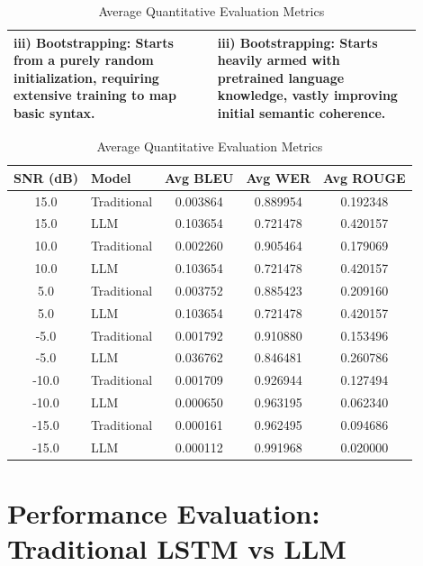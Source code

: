 \documentclass[twocolumn]{article}
\begin{document}
\begin{table}[t]
\begin{minipage}[t]{0.48\textwidth}
\begin{tabular}{p{0.45\linewidth} p{0.45\linewidth}}
\textbf{iii) Bootstrapping:} Starts from a purely random initialization, requiring extensive training to map basic syntax. & \textbf{iii) Bootstrapping:} Starts heavily armed with pretrained language knowledge, vastly improving initial semantic coherence. \\
\bottomrule
\end{tabular}
\end{minipage}\hfill
\begin{minipage}[t]{0.48\textwidth}
\centering
\caption{Average Quantitative Evaluation Metrics}
\label{tab:quantitative_metrics}
\renewcommand{\arraystretch}{1.2}
\begin{tabular}{clccc}
\toprule
\textbf{SNR (dB)} & \textbf{Model} & \textbf{Avg BLEU} & \textbf{Avg WER} & \textbf{Avg ROUGE} \\
\midrule
15.0 & Traditional & 0.003864 & 0.889954 & 0.192348 \\
15.0 & LLM & 0.103654 & 0.721478 & 0.420157 \\
\midrule
10.0 & Traditional & 0.002260 & 0.905464 & 0.179069 \\
10.0 & LLM & 0.103654 & 0.721478 & 0.420157 \\
\midrule
5.0 & Traditional & 0.003752 & 0.885423 & 0.209160 \\
5.0 & LLM & 0.103654 & 0.721478 & 0.420157 \\
\midrule
-5.0 & Traditional & 0.001792 & 0.910880 & 0.153496 \\
-5.0 & LLM & 0.036762 & 0.846481 & 0.260786 \\
\midrule
-10.0 & Traditional & 0.001709 & 0.926944 & 0.127494 \\
-10.0 & LLM & 0.000650 & 0.963195 & 0.062340 \\
\midrule
-15.0 & Traditional & 0.000161 & 0.962495 & 0.094686 \\
-15.0 & LLM & 0.000112 & 0.991968 & 0.020000 \\
\bottomrule
\end{tabular}
\end{minipage}
\end{table}


\section{\large \textbf{Performance Evaluation: Traditional LSTM vs LLM}}
\end{document}
